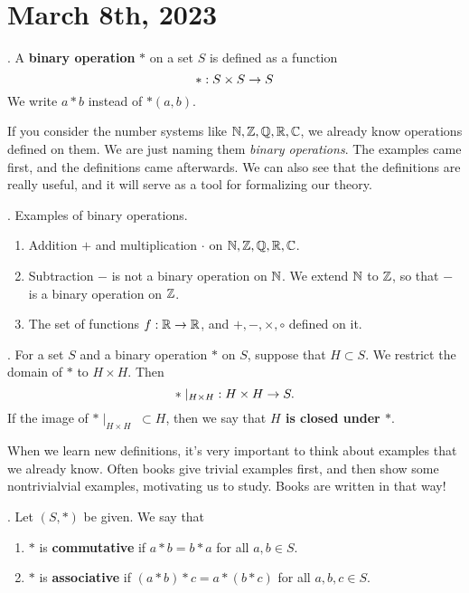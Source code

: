 
\section*{March 8th, 2023}

.  A \textbf{binary operation} \(*\) on a set \(S\) is defined as a function
\[
    *: S \times S \rightarrow S
\]
We write \(a * b\) instead of \(*(a, b)\).

\rmk If you consider the number systems like \(\mathbb{N}, \mathbb{Z}, \mathbb{Q}, \mathbb{R}, \mathbb{C}\), we already know operations defined on them. We are just naming them \textit{binary operations}. The examples came first, and the definitions came afterwards. We can also see that the definitions are really useful, and it will serve as a tool for formalizing our theory.

\ex. Examples of binary operations.
\begin{enumerate}
    \item Addition \(+\) and multiplication \(\cdot\) on \(\mathbb{N}, \mathbb{Z}, \mathbb{Q}, \mathbb{R}, \mathbb{C}\).
    \item Subtraction \(-\) is not a binary operation on \(\mathbb{N}\). We extend \(\mathbb{N}\) to \(\mathbb{Z}\), so that \(-\) is a binary operation on \(\mathbb{Z}\).
    \item The set of functions \(f: \mathbb{R} \rightarrow \mathbb{R}\), and \(+, -, \times, \circ\) defined on it.
\end{enumerate}

.  For a set \(S\) and a binary operation \(*\) on \(S\), suppose that \(H \subset S\). We restrict the domain of \(*\) to \(H \times H\). Then
\[
    *\mid_{H\times H} \;: H\times H \rightarrow S.
\]
If the image of \(*\mid_{H\times H} \;\subset H\), then we say that \textbf{\(H\) is closed under \(*\)}.

\rmk When we learn new definitions, it's very important to think about examples that we already know. Often books give trivial examples first, and then show some nontrivialvial examples, motivating us to study. Books are written in that way!

. Let \((S, *)\) be given. We say that
\begin{enumerate}
    \item \(*\) is \textbf{commutative} if \(a * b = b * a\) for all \(a, b \in S\).
    \item \(*\) is \textbf{associative} if \((a * b)* c = a * (b * c)\) for all \(a, b, c \in S\).
\end{enumerate}

